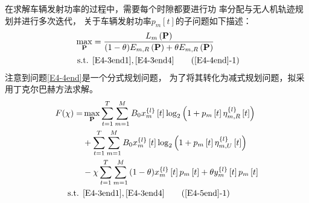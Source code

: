 在求解车辆发射功率的过程中，需要每个时隙都要进行功
率分配与无人机轨迹规划并进行多次迭代，
关于车辆发射功率$p_m\left[t\right]$的子问题如下描述：
\begin{align}
\max _{ \mathbf{P}} &   ={\frac{{{L}_{m}}\left( \mathbf{P} \right)}
{(1-\theta){E}_{m,R}\left( \mathbf{P} \right)+\theta{E}_{m,R}\left( \mathbf{P} \right)}}         \label{E4-4end}\\
\text { s.t. }
& \eqref{E4-3end1},\eqref{E4-3end4}                                 \tag{\ref{E4-4end}{-1}}      \label{E4-4end1}
\end{align}
注意到问题\eqref{E4-4end}是一个分式规划问题，
为了将其转化为减式规划问题，拟采用丁克尔巴赫方法求解。
\begin{align} \notag
F(\chi)= & \max _{ \mathbf{P}} \sum_{t=1}^T \sum_{m=1}^M {B}_{0}x_{m}^{\left\{ l \right\}}\left[ t \right] %
\log_2{\left(1+p_m\left[t\right]\eta_{m,R}^{\left\{ l \right\}}\left[t\right]\right)}                         \\       \label{E4-5end}
& + \sum_{t=1}^T \sum_{m=1}^M {B}_{0}x_{m}^{\left\{ l \right\}}\left[ t \right]
\log_2{\left(1+p_m\left[t\right]\eta_{m,U}^{\left\{ l \right\}}\left[t\right]\right)}                         \\ \notag
& -\chi \sum_{t=1}^T \sum_{m=1}^M{(1-\theta)x_{m}^{\left\{ l \right\}}\left[ t \right]p_m\left[t\right]
+\theta y_{m}^{\left\{ l \right\}}\left[ t \right]p_m\left[t\right]}                                          \\ \notag
\text { s.t. }
& \eqref{E4-3end1},\eqref{E4-3end4}                                       \tag{\ref{E4-5end}{-1}}                      \label{E4-5end1}
\end{align}

